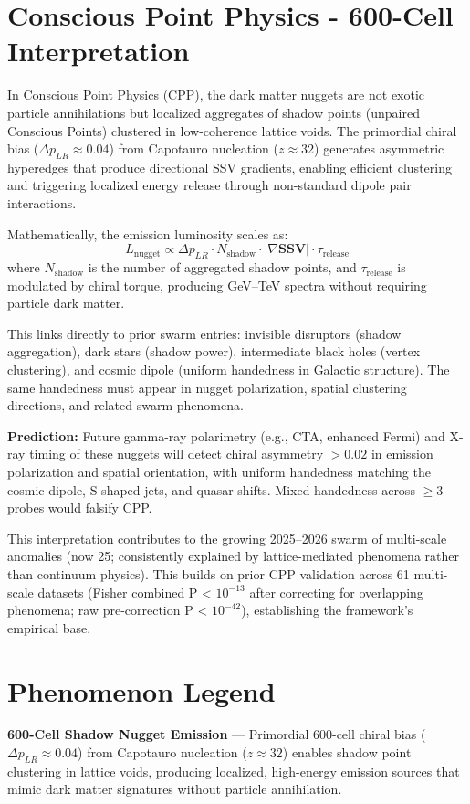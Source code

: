 \documentclass[11pt]{article}
\begin{document}
\section{Conscious Point Physics - 600-Cell Interpretation}
In Conscious Point Physics (CPP), the dark matter nuggets are not exotic particle annihilations but localized aggregates of shadow points (unpaired Conscious Points) clustered in low-coherence lattice voids. The primordial chiral bias ($\Delta p_{LR} \approx 0.04$) from Capotauro nucleation ($z \approx 32$) generates asymmetric hyperedges that produce directional SSV gradients, enabling efficient clustering and triggering localized energy release through non-standard dipole pair interactions.

Mathematically, the emission luminosity scales as:
\[
L_{\text{nugget}} \propto \Delta p_{LR} \cdot N_{\text{shadow}} \cdot |\nabla \mathbf{SSV}| \cdot \tau_{\text{release}}
\]
where $N_{\text{shadow}}$ is the number of aggregated shadow points, and $\tau_{\text{release}}$ is modulated by chiral torque, producing GeV–TeV spectra without requiring particle dark matter.

This links directly to prior swarm entries: invisible disruptors (shadow aggregation), dark stars (shadow power), intermediate black holes (vertex clustering), and cosmic dipole (uniform handedness in Galactic structure). The same handedness must appear in nugget polarization, spatial clustering directions, and related swarm phenomena.

\textbf{Prediction:} Future gamma-ray polarimetry (e.g., CTA, enhanced Fermi) and X-ray timing of these nuggets will detect chiral asymmetry $>0.02$ in emission polarization and spatial orientation, with uniform handedness matching the cosmic dipole, S-shaped jets, and quasar shifts. Mixed handedness across $\geq 3$ probes would falsify CPP.

This interpretation contributes to the growing 2025--2026 swarm of multi-scale anomalies (now 25; consistently explained by lattice-mediated phenomena rather than continuum physics). This builds on prior CPP validation across 61 multi-scale datasets (Fisher combined P < $10^{-13}$ after correcting for overlapping phenomena; raw pre-correction P < $10^{-42}$), establishing the framework's empirical base.

\section{Phenomenon Legend}
\textbf{600-Cell Shadow Nugget Emission} — Primordial 600-cell chiral bias ($\Delta p_{LR} \approx 0.04$) from Capotauro nucleation ($z \approx 32$) enables shadow point clustering in lattice voids, producing localized, high-energy emission sources that mimic dark matter signatures without particle annihilation.
\end{document}
